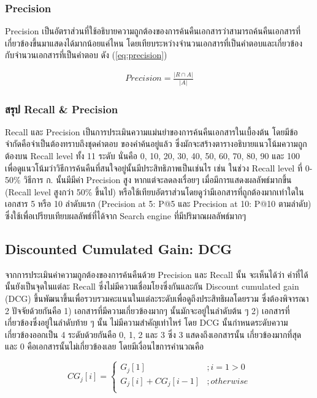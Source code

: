 \documentclass[11pt,a4paper]{article}
\begin{document}
{{{\subsubsection{Precision}

Precision เป็นอัตราส่วนที่ใช้อธิบายความถูกต้องของการค้นคืนเอกสารว่าสามารถค้นคืนเอกสารที่เกี่ยวข้องขึ้นมาแสดงได้มากน้อยแค่ไหน 
โดยเทียบระหว่างจำนวนเอกสารที่เป็นคำตอบและเกี่ยวข้อง กับจำนวนเอกสารที่เป็นคำตอบ ดัง (\ref{eq:precision})

\begin{align*}
    Precision = \frac{|R \cap A|}{|A|}
    \label{eq:precision}
\end{align*}

\subsubsection{สรุป Recall \& Precision}

Recall และ Precision เป็นการประเมินความแม่นยำของการค้นคืนเอกสารในเบื้องต้น โดยมีข้อจำกัดคือจำเป็นต้องทราบถึงชุดคำตอบ
ของคำค้นอยู่แล้ว ซึ่งมักจะสร้างตารางอธิบายแนวโน้มความถูกต้องบน Recall level ทั้ง 11 ระดับ นั่นคือ 0, 10, 20, 30, 40, 50,
60, 70, 80, 90 และ 100 เพื่อดูแนวโน้มว่าวิธีการค้นคืนที่สนใจอยู่นั้นมีประสิทธิภาพเป็นเช่นไร เช่น ในช่วง Recall level ที่ 0-50\%
วิธีการ ก. นั้นมีมีค่า Precision สูง หากแต่จะลดลงเรื่อยๆ เมื่อมีการแสดงผลลัพธ์มากขึ้น (Recall level สูงกว่า 50\% ขึ้นไป)
หรือใช้เทียบอัตราส่วนโดยดูว่ามีเอกสารที่ถูกต้องมากเท่าใดในเอกสาร 5 หรือ 10 ลำดับแรก (Precision at 5: P@5 
และ Precision at 10: P@10 ตามลำดับ) ซึ่งใช้เพื่อเปรียบเทียบผลลัพธ์ที่ได้จาก Search engine ที่มีปริมาณผลลัพธ์มากๆ 

\subsection{Discounted Cumulated Gain: DCG}
จากการประเมินค่าความถูกต้องของการค้นคืนด้วย Precision และ Recall นั้น จะเห็นได้ว่า ค่าที่ได้นั้นยังเป็นจุดในแต่ละ Recall 
ซึ่งไม่มีความเชื่อมโยงซึ่งกันและกัน Discount cumulated gain (DCG) ขึ้นพัฒนาขึ้นเพื่อรวบรวมคะแนนในแต่ละระดับเพื่อดูถึงประสิทธิผลโดยรวม
ซึ่งต้องพิจารณา 2 ปัจจัยด้วยกันคือ 1) เอกสารที่มีความเกี่ยวข้องมากๆ นั้นมักจะอยู่ในลำดับต้น ๆ 2) เอกสารที่เกี่ยวข้องซึ่งอยู่ในลำดับท้าย ๆ นั้น
ไม่มีความสำคัญเท่าไหร่ โดย DCG นั้นกำหนดระดับความเกี่ยวข้องออกเป็น 4 ระดับด้วยกันคือ 0, 1, 2 และ 3 ซึ่ง 3 แสดงถึงเอกสารนั้น
เกี่ยวข้องมากที่สุด และ 0 คือเอกสารนั้นไม่เกี่ยวข้องเลย โดยมีเงื่อนไขการคำนวณคือ

\begin{equation}
    CG_j[i] = 
    \begin{cases}
        G_j[1]              &; i = 1 > 0 \\
        G_j[i] + CG_j[i-1]  &; otherwise \\
    \end{cases}
    \label{eq:cg}
\end{equation}

}}}
\end{document}
